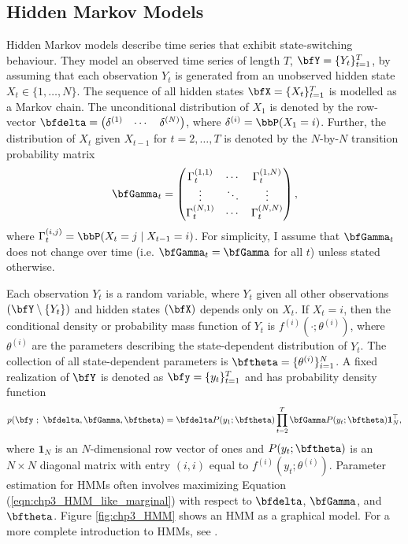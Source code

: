\subsection{Hidden Markov Models}

Hidden Markov models describe time series that exhibit state-switching behaviour. They model an observed time series of length $T$, $\bfY = \{Y_t\}_{t=1}^T$, by assuming that each observation $Y_t$ is generated from an unobserved hidden state $X_t \in \{1,\ldots,N\}$. The sequence of all hidden states $\bfX = \{X_t\}_{t=1}^T$ is modelled as a Markov chain. The unconditional distribution of $X_1$ is denoted by the row-vector $\bfdelta = \begin{pmatrix} \delta^{(1)} & \cdots & \delta^{(N)} \end{pmatrix}$, where $\delta^{(i)} = \bbP(X_1 = i)$. Further, the distribution of $X_t$ given $X_{t-1}$ for $t = 2,\ldots,T$ is denoted by the $N$-by-$N$ transition probability matrix 
%
\begin{equation}
    \bfGamma_t = \begin{pmatrix} 
    \Gamma_t^{(1,1)} & \cdots & \Gamma_t^{(1,N)} \\
    \vdots & \ddots & \vdots \\
    \Gamma_t^{(N,1)} & \cdots & \Gamma_t^{(N,N)} \\
    \end{pmatrix},
\end{equation}
%
where $\Gamma_t^{(i,j)} = \bbP(X_t = j \mid X_{t-1} = i)$. For simplicity, I assume that $\bfGamma_t$ does not change over time (i.e. $\bfGamma_t = \bfGamma$ for all $t$) unless stated otherwise. 

Each observation $Y_t$ is a random variable, where $Y_t$ given all other observations $(\bfY \setminus \{Y_t\})$ and hidden states $(\bfX)$ depends only on $X_t$. If $X_t=i$, then the conditional density or probability mass function of $Y_t$ is $f^{(i)}(\cdot ; \theta^{(i)})$, where $\theta^{(i)}$ are the parameters describing the state-dependent distribution of $Y_t$. The collection of all state-dependent parameters is $\bftheta = \{\theta^{(i)}\}_{i=1}^N$. A fixed realization of $\bfY$ is denoted as $\bfy = \{y_t\}_{t=1}^T$ and has probability density function
%
\begin{equation}
    p(\bfy ~;~ \bfdelta,\bfGamma,\bftheta) = \bfdelta P(y_1;\bftheta) \prod_{t=2}^T \bfGamma P(y_t;\bftheta) \mathbf{1}^\top_N, 
    \label{eqn:chp3_HMM_like_marginal}
\end{equation}
%
where $\mathbf{1}_N$ is an $N$-dimensional row vector of ones and $P(y_t;\bftheta)$ is an $N \times N$ diagonal matrix with entry $(i,i)$ equal to $f^{(i)}(y_t; \theta^{(i)})$. Parameter estimation for HMMs often involves maximizing Equation (\ref{eqn:chp3_HMM_like_marginal}) with respect to $\bfdelta$, $\bfGamma$, and $\bftheta$. Figure \ref{fig:chp3_HMM} shows an HMM as a graphical model. For a more complete introduction to HMMs, see \citet{Zucchini:2016}. 

